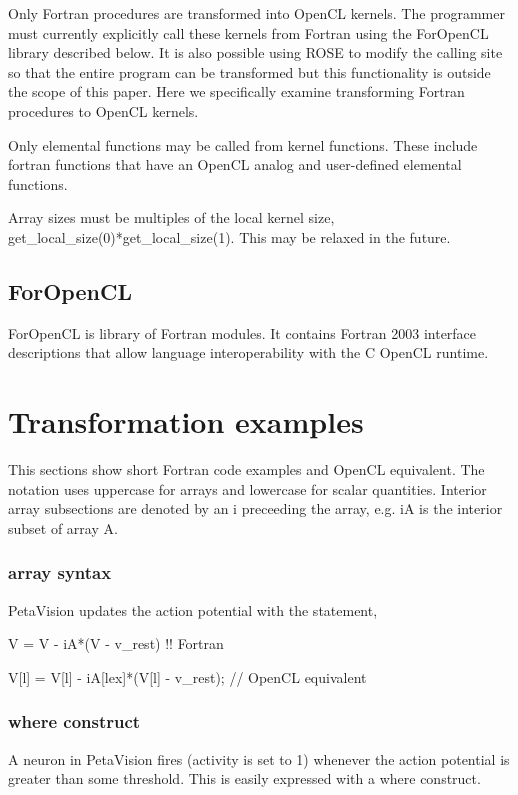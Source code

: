 Only Fortran procedures are transformed into OpenCL kernels.  The programmer
must currently explicitly call these kernels from Fortran using the ForOpenCL
library described below.  It is also possible using ROSE to modify the calling
site so that the entire program can be transformed but this functionality is
outside the scope of this paper.  Here we specifically examine transforming
Fortran procedures to OpenCL kernels.

Only elemental functions may be called from kernel functions.  These include
fortran functions that have an OpenCL analog and user-defined elemental functions.

Array sizes must be multiples of the local kernel size,
get_local_size(0)*get_local_size(1).  This may be relaxed in the future.

\subsection{ForOpenCL}

ForOpenCL is library of Fortran modules.  It contains Fortran 2003 interface
descriptions that allow language interoperability with the C OpenCL runtime.

\section{Transformation examples}

This sections show short Fortran code examples and OpenCL equivalent.
The notation uses uppercase for arrays and lowercase for scalar quantities.
Interior array subsections are denoted by an i preceeding the array, e.g. iA
is the interior subset of array A.

\subsubsection{array syntax}

PetaVision updates the action potential with the statement,

   V = V - iA*(V - v_rest)                  !! Fortran

   V[l] = V[l] - iA[lex]*(V[l] - v_rest);   // OpenCL equivalent

\subsubsection{where construct}

A neuron in PetaVision fires (activity is set to 1)
whenever the action potential is greater than some threshold.
This is easily expressed with a where construct.

